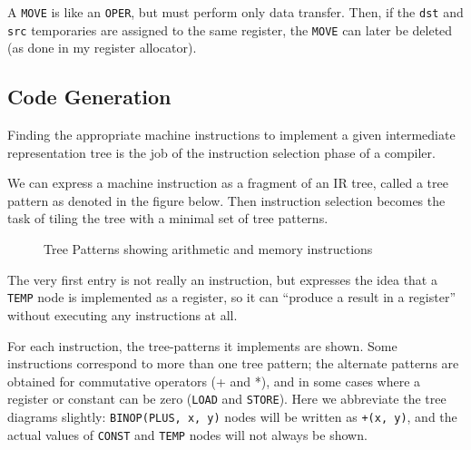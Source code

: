 A \texttt{MOVE}
is like an
\texttt{OPER},
but must perform only data transfer. Then, if the
\texttt{dst} and
\texttt{src}
temporaries are assigned to the same register, the
\texttt{MOVE}
can later be deleted (as done in my register allocator).

\hypertarget{code-generation}{%
\subsection{Code Generation}\label{code-generation}}

Finding the appropriate machine instructions to implement a given
intermediate representation tree is the job of the instruction selection
phase of a compiler.

We can express a machine instruction as a fragment of an IR tree, called
a tree pattern as denoted in the figure below. Then instruction
selection becomes the task of tiling the tree with a minimal set of tree
patterns.

\begin{figure}
\centering
{}
\caption{Tree Patterns showing arithmetic and memory instructions}
\end{figure}

The very first entry is not really an instruction, but expresses the
idea that a
\texttt{TEMP}
node is implemented as a register, so it can ``produce a result in a
register'' without executing any instructions at all.

For each instruction, the tree-patterns it implements are shown. Some
instructions correspond to more than one tree pattern; the alternate
patterns are obtained for commutative operators (+ and *), and in some
cases where a register or constant can be zero
(\texttt{LOAD}
and
\texttt{STORE}).
Here we abbreviate the tree diagrams slightly:
\texttt{BINOP(PLUS, x, y)}
nodes will be written as
\texttt{+(x, y)},
and the actual values of
\texttt{CONST}
and
\texttt{TEMP}
nodes will not always be shown.

